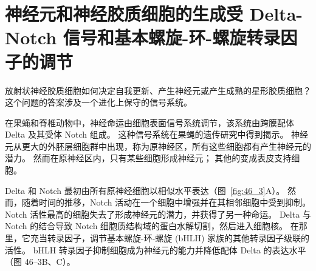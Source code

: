 \section{神经元和神经胶质细胞的生成受 Delta-Notch 信号和基本螺旋-环-螺旋转录因子的调节}

放射状神经胶质细胞如何决定自我更新、产生神经元或产生成熟的星形胶质细胞？
这个问题的答案涉及一个进化上保守的信号系统。


在果蝇和脊椎动物中，神经命运由细胞表面信号系统调节，该系统由跨膜配体 Delta 及其受体 Notch 组成。
这种信号系统在果蝇的遗传研究中得到揭示。
神经元从更大的外胚层细胞群中出现，称为原神经区，所有这些细胞都有产生神经元的潜力。
然而在原神经区内，只有某些细胞形成神经元；
其他的变成表皮支持细胞。


Delta 和 Notch 最初由所有原神经细胞以相似水平表达（图~\ref{fig:46_3}A）。
然而，随着时间的推移，Notch 活动在一个细胞中增强并在其相邻细胞中受到抑制。
Notch 活性最高的细胞失去了形成神经元的潜力，并获得了另一种命运。
Delta 与 Notch 的结合导致 Notch 细胞质结构域的蛋白水解切割，然后进入细胞核。
在那里，它充当转录因子，调节基本螺旋-环-螺旋 (bHLH) 家族的其他转录因子级联的活性。
bHLH 转录因子抑制细胞成为神经元的能力并降低配体 Delta 的表达水平（图 46–3B、C）。


